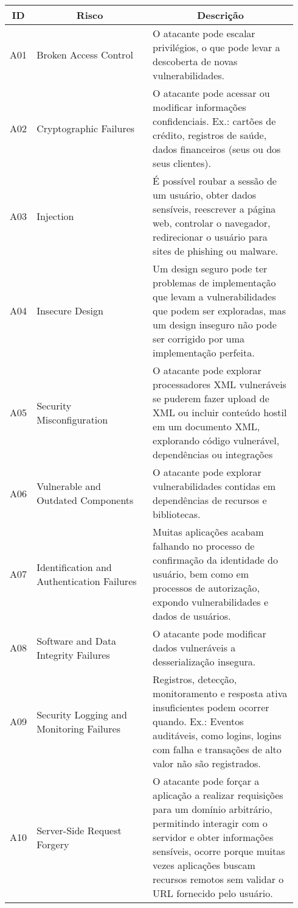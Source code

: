 \begin{enumerate}
    \begin{quadro}[H]
    \footnotesize
    \caption{Lista OWASP 2021}
    \label{requisitos-funcionais}
        \begin{tabular}{|p{0.04\linewidth} | p{0.40\linewidth} | p{0.50\linewidth} |}  \hline
          \multicolumn{1}{|c|}{\textbf{ID}} &
          \multicolumn{1}{c|}{\textbf{Risco}} &
          \multicolumn{1}{c|}{\textbf{Descrição}}  \\ \hline
    A01& Broken Access Control & O atacante pode escalar privilégios, o que pode levar a descoberta de novas vulnerabilidades.  \\ \hline
    A02 & Cryptographic Failures & O atacante pode acessar ou modificar informações confidenciais. Ex.: cartões de crédito, registros de saúde, dados financeiros (seus ou dos seus clientes).   \\ \hline
    A03 & Injection & É possível roubar a sessão de um usuário, obter dados sensíveis, reescrever a página web, controlar o navegador, redirecionar o usuário para sites de \gls{phishing} ou \gls{malware}.  \\ \hline 
    A04 & Insecure Design & Um design seguro pode ter problemas de implementação que levam a 
    vulnerabilidades que podem ser exploradas, mas um design inseguro não pode ser 
    corrigido por uma implementação perfeita.   \\ \hline
    A05 & Security Misconfiguration & O atacante pode explorar processadores \gls{XML} vulneráveis se puderem fazer upload de XML ou incluir conteúdo hostil em um documento XML, explorando código vulnerável, dependências ou integrações  \\ \hline
    A06 & Vulnerable and Outdated Components & O atacante pode explorar vulnerabilidades contidas em dependências de recursos e bibliotecas. \\ \hline
    A07 & Identification and Authentication Failures & Muitas aplicações acabam falhando no processo de confirmação da identidade do usuário, bem como em processos de autorização, expondo vulnerabilidades e dados de usuários.
\\ \hline
    A08 & Software and Data Integrity Failures & O atacante pode  modificar dados vulneráveis a desserialização insegura.  \\ \hline
    A09 & Security Logging and Monitoring Failures & Registros, detecção, monitoramento e resposta ativa insuficientes podem ocorrer quando. Ex.: Eventos auditáveis, como logins, logins com falha e transações de alto valor não são registrados. \\ \hline
    A10 & Server-Side Request Forgery  & O atacante pode forçar a aplicação a realizar requisições para um domínio arbitrário, permitindo interagir com o servidor e obter informações sensíveis, ocorre porque muitas vezes aplicações buscam recursos remotos sem validar o \gls{URL} fornecido pelo usuário. \\ \hline
        \end{tabular}
    \end{quadro}
\end{enumerate}

